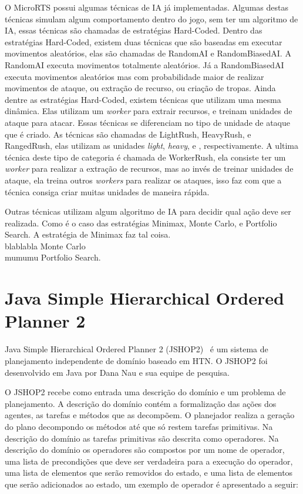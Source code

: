 O MicroRTS possui algumas técnicas de IA já implementadas. 
Algumas destas técnicas simulam algum comportamento dentro do jogo, sem ter um algoritmo de IA, essas técnicas são chamadas de estratégias Hard-Coded. 
Dentro das estratégias Hard-Coded, existem duas técnicas que são baseadas em executar movimentos aleatórios, elas são chamadas de RandomAI e RandomBiasedAI.
A RandomAI executa movimentos totalmente aleatórios.
Já a RandomBiasedAI executa movimentos aleatórios mas com probabilidade maior de realizar movimentos de ataque, ou extração de recurso, ou criação de tropas. 
Ainda dentre as estratégias Hard-Coded, existem técnicas que utilizam uma mesma dinâmica. 
Elas utilizam um \textit{worker} para extrair recursos, e treinam unidades de ataque para atacar. 
Essas técnicas se diferenciam no tipo de unidade de ataque que é criado. 
As técnicas são chamadas de LightRush, HeavyRush, e RangedRush, elas utilizam as unidades \textit{light}, \textit{heavy}, e , respectivamente.
A ultima técnica deste tipo de categoria é chamada de WorkerRush, ela consiste ter um \textit{worker} para realizar a extração de recursos, mas ao invés de treinar unidades de ataque, ela treina outros \textit{workers} para realizar os ataques, isso faz com que a técnica consiga criar muitas unidades de maneira rápida.

Outras técnicas utilizam algum algoritmo de IA para decidir qual ação deve ser realizada.
Como é o caso das estratégias Minimax, Monte Carlo, e Portfolio Search.
A estratégia de Minimax faz tal coisa. \\
blablabla Monte Carlo \\
mumumu Portfolio Search.

\section{Java Simple Hierarchical Ordered Planner 2}\label{sec:jshop}
		
Java Simple Hierarchical Ordered Planner 2 (JSHOP2)~\cite{ilghami2006documentation} é um sistema de planejamento independente de domínio baseado em HTN. O JSHOP2 foi desenvolvido em Java por Dana Nau e sua equipe de pesquisa. 

O JSHOP2 recebe como entrada uma descrição do domínio e um problema de planejamento. 
A descrição do domínio contém a formalização das ações dos agentes, as tarefas e métodos que as decompõem.
O planejador realiza a geração do plano decompondo os métodos até que só restem tarefas primitivas. Na descrição do domínio as tarefas primitivas são descrita como operadores. Na descrição do domínio os operadores são compostos por um nome de operador, uma lista de precondições que deve ser verdadeira para a execução do operador, uma lista de elementos que serão removidos do estado, e uma lista de elementos que serão adicionados ao estado, um exemplo de operador é apresentado a seguir:


